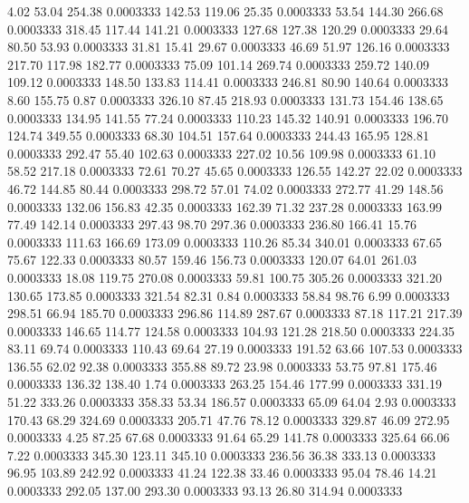   4.02   53.04  254.38   0.0003333
 142.53  119.06   25.35   0.0003333
  53.54  144.30  266.68   0.0003333
 318.45  117.44  141.21   0.0003333
 127.68  127.38  120.29   0.0003333
  29.64   80.50   53.93   0.0003333
  31.81   15.41   29.67   0.0003333
  46.69   51.97  126.16   0.0003333
 217.70  117.98  182.77   0.0003333
  75.09  101.14  269.74   0.0003333
 259.72  140.09  109.12   0.0003333
 148.50  133.83  114.41   0.0003333
 246.81   80.90  140.64   0.0003333
   8.60  155.75    0.87   0.0003333
 326.10   87.45  218.93   0.0003333
 131.73  154.46  138.65   0.0003333
 134.95  141.55   77.24   0.0003333
 110.23  145.32  140.91   0.0003333
 196.70  124.74  349.55   0.0003333
  68.30  104.51  157.64   0.0003333
 244.43  165.95  128.81   0.0003333
 292.47   55.40  102.63   0.0003333
 227.02   10.56  109.98   0.0003333
  61.10   58.52  217.18   0.0003333
  72.61   70.27   45.65   0.0003333
 126.55  142.27   22.02   0.0003333
  46.72  144.85   80.44   0.0003333
 298.72   57.01   74.02   0.0003333
 272.77   41.29  148.56   0.0003333
 132.06  156.83   42.35   0.0003333
 162.39   71.32  237.28   0.0003333
 163.99   77.49  142.14   0.0003333
 297.43   98.70  297.36   0.0003333
 236.80  166.41   15.76   0.0003333
 111.63  166.69  173.09   0.0003333
 110.26   85.34  340.01   0.0003333
  67.65   75.67  122.33   0.0003333
  80.57  159.46  156.73   0.0003333
 120.07   64.01  261.03   0.0003333
  18.08  119.75  270.08   0.0003333
  59.81  100.75  305.26   0.0003333
 321.20  130.65  173.85   0.0003333
 321.54   82.31    0.84   0.0003333
  58.84   98.76    6.99   0.0003333
 298.51   66.94  185.70   0.0003333
 296.86  114.89  287.67   0.0003333
  87.18  117.21  217.39   0.0003333
 146.65  114.77  124.58   0.0003333
 104.93  121.28  218.50   0.0003333
 224.35   83.11   69.74   0.0003333
 110.43   69.64   27.19   0.0003333
 191.52   63.66  107.53   0.0003333
 136.55   62.02   92.38   0.0003333
 355.88   89.72   23.98   0.0003333
  53.75   97.81  175.46   0.0003333
 136.32  138.40    1.74   0.0003333
 263.25  154.46  177.99   0.0003333
 331.19   51.22  333.26   0.0003333
 358.33   53.34  186.57   0.0003333
  65.09   64.04    2.93   0.0003333
 170.43   68.29  324.69   0.0003333
 205.71   47.76   78.12   0.0003333
 329.87   46.09  272.95   0.0003333
   4.25   87.25   67.68   0.0003333
  91.64   65.29  141.78   0.0003333
 325.64   66.06    7.22   0.0003333
 345.30  123.11  345.10   0.0003333
 236.56   36.38  333.13   0.0003333
  96.95  103.89  242.92   0.0003333
  41.24  122.38   33.46   0.0003333
  95.04   78.46   14.21   0.0003333
 292.05  137.00  293.30   0.0003333
  93.13   26.80  314.94   0.0003333
